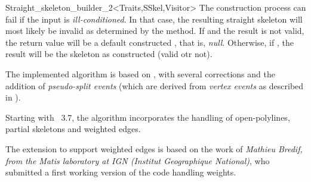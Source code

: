 \begin{ccRefClass}{Straight_skeleton_builder_2<Traits,SSkel,Visitor>}
{The construction process can fail if the input is {\em ill-conditioned}. In that case, the resulting straight skeleton
will most likely be invalid as determined by the  method. If  and the result is
not valid, the return value will be a default constructed , that is, {\em null}. Otherwise, if 
, the result will be the skeleton as constructed (valid otr not). 
}




The implemented algorithm is based on \cite{cgal:fo-ss-98}, with several corrections and the addition of \textit{pseudo-split events}
(which are derived from \textit{vertex events} as described in \cite{cgal:ee-rrccpp-98}).

Starting with \cgal\ 3.7, the algorithm incorporates the handling of open-polylines, partial skeletons and weighted edges.

The extension to support weighted edges is based on the work of {\em Mathieu Bredif, from the Matis laboratory at IGN (Institut Geographique National)},
who submitted a first working version of the code handling weights.


\end{ccRefClass}
